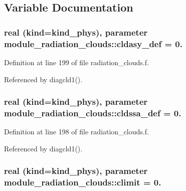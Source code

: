 \subsection{Variable Documentation}
\subsubsection[{\texorpdfstring{cldasy\+\_\+def}{cldasy_def}}]{\setlength{\rightskip}{0pt plus 5cm}real (kind=kind\+\_\+phys), parameter module\+\_\+radiation\+\_\+clouds\+::cldasy\+\_\+def = 0.\hspace{0.3cm}{\ttfamily [private]}}\hypertarget{group__module__radiation__clouds_gab94e45a81d8be82b6cb686b35fd78a80}{}\label{group__module__radiation__clouds_gab94e45a81d8be82b6cb686b35fd78a80}


Definition at line 199 of file radiation\+\_\+clouds.\+f.



Referenced by diagcld1().

\subsubsection[{\texorpdfstring{cldssa\+\_\+def}{cldssa_def}}]{\setlength{\rightskip}{0pt plus 5cm}real (kind=kind\+\_\+phys), parameter module\+\_\+radiation\+\_\+clouds\+::cldssa\+\_\+def = 0.\hspace{0.3cm}{\ttfamily [private]}}\hypertarget{group__module__radiation__clouds_ga2ce850be46f0144caa09309ae01958c2}{}\label{group__module__radiation__clouds_ga2ce850be46f0144caa09309ae01958c2}


Definition at line 198 of file radiation\+\_\+clouds.\+f.



Referenced by diagcld1().

\subsubsection[{\texorpdfstring{climit}{climit}}]{\setlength{\rightskip}{0pt plus 5cm}real (kind=kind\+\_\+phys), parameter module\+\_\+radiation\+\_\+clouds\+::climit = 0.\hspace{0.3cm}{\ttfamily [private]}}\hypertarget{group__module__radiation__clouds_gad4d5840310847f5bf39082114069ceb8}{}\label{group__module__radiation__clouds_gad4d5840310847f5bf39082114069ceb8}


